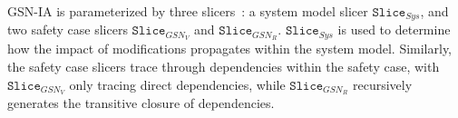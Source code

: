 GSN-IA is parameterized by three slicers~\cite{Salay:2016}: a system model slicer $\mathtt{Slice}_{Sys}$, and two safety case slicers $\mathtt{Slice}_{GSN_V}$ and $\mathtt{Slice}_{GSN_R}$. $\mathtt{Slice}_{Sys}$ is used to
determine how the impact of modifications propagates within the system model. Similarly, the safety case slicers trace through dependencies within the safety case, with $\mathtt{Slice}_{GSN_V}$ only tracing direct dependencies, while $\mathtt{Slice}_{GSN_R}$ recursively generates the transitive closure of dependencies.




